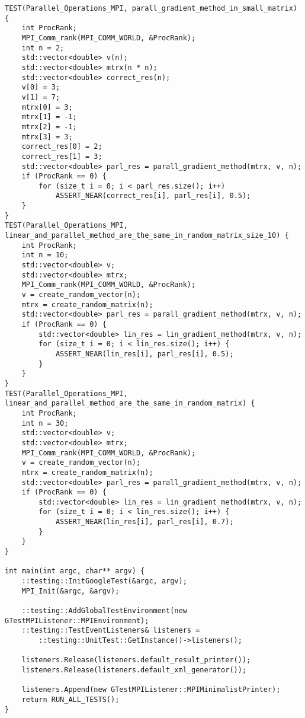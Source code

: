 \documentclass{report}
\begin{document}
\begin{lstlisting}
TEST(Parallel_Operations_MPI, parall_gradient_method_in_small_matrix) {
    int ProcRank;
    MPI_Comm_rank(MPI_COMM_WORLD, &ProcRank);
    int n = 2;
    std::vector<double> v(n);
    std::vector<double> mtrx(n * n);
    std::vector<double> correct_res(n);
    v[0] = 3;
    v[1] = 7;
    mtrx[0] = 3;
    mtrx[1] = -1;
    mtrx[2] = -1;
    mtrx[3] = 3;
    correct_res[0] = 2;
    correct_res[1] = 3;
    std::vector<double> parl_res = parall_gradient_method(mtrx, v, n);
    if (ProcRank == 0) {
        for (size_t i = 0; i < parl_res.size(); i++)
            ASSERT_NEAR(correct_res[i], parl_res[i], 0.5);
    }
}
TEST(Parallel_Operations_MPI, linear_and_parallel_method_are_the_same_in_random_matrix_size_10) {
    int ProcRank;
    int n = 10;
    std::vector<double> v;
    std::vector<double> mtrx;
    MPI_Comm_rank(MPI_COMM_WORLD, &ProcRank);
    v = create_random_vector(n);
    mtrx = create_random_matrix(n);
    std::vector<double> parl_res = parall_gradient_method(mtrx, v, n);
    if (ProcRank == 0) {
        std::vector<double> lin_res = lin_gradient_method(mtrx, v, n);
        for (size_t i = 0; i < lin_res.size(); i++) {
            ASSERT_NEAR(lin_res[i], parl_res[i], 0.5);
        }
    }
}
TEST(Parallel_Operations_MPI, linear_and_parallel_method_are_the_same_in_random_matrix) {
    int ProcRank;
    int n = 30;
    std::vector<double> v;
    std::vector<double> mtrx;
    MPI_Comm_rank(MPI_COMM_WORLD, &ProcRank);
    v = create_random_vector(n);
    mtrx = create_random_matrix(n);
    std::vector<double> parl_res = parall_gradient_method(mtrx, v, n);
    if (ProcRank == 0) {
        std::vector<double> lin_res = lin_gradient_method(mtrx, v, n);
        for (size_t i = 0; i < lin_res.size(); i++) {
            ASSERT_NEAR(lin_res[i], parl_res[i], 0.7);
        }
    }
}

int main(int argc, char** argv) {
    ::testing::InitGoogleTest(&argc, argv);
    MPI_Init(&argc, &argv);

    ::testing::AddGlobalTestEnvironment(new GTestMPIListener::MPIEnvironment);
    ::testing::TestEventListeners& listeners =
        ::testing::UnitTest::GetInstance()->listeners();

    listeners.Release(listeners.default_result_printer());
    listeners.Release(listeners.default_xml_generator());

    listeners.Append(new GTestMPIListener::MPIMinimalistPrinter);
    return RUN_ALL_TESTS();
}
\end{lstlisting}
\end{document}
